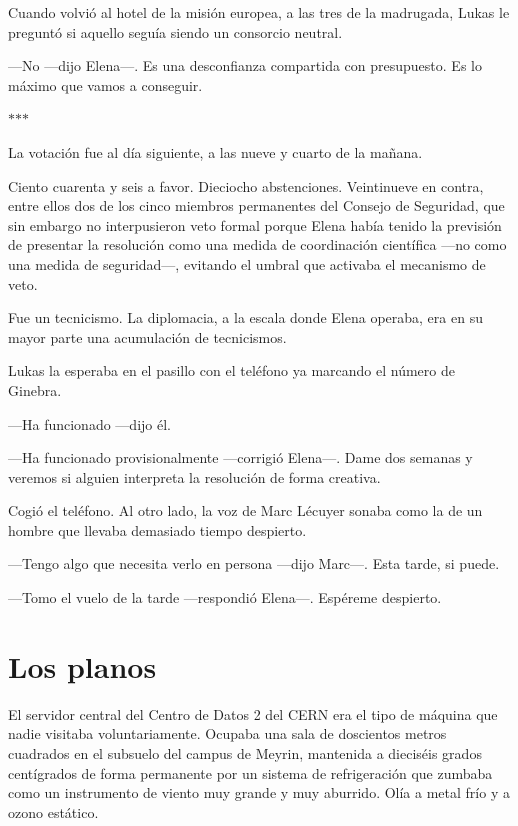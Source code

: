 \documentclass[11pt,a5paper,twoside]{book}
\begin{document}
Cuando volvió al hotel de la misión europea, a las tres de la madrugada, Lukas le preguntó si aquello seguía siendo un consorcio neutral.

—No —dijo Elena—. Es una desconfianza compartida con presupuesto. Es lo máximo que vamos a conseguir.

\vspace{1.5em}
\begin{center}$\ast$\quad$\ast$\quad$\ast$\end{center}
\vspace{1.5em}

La votación fue al día siguiente, a las nueve y cuarto de la mañana.

Ciento cuarenta y seis a favor. Dieciocho abstenciones. Veintinueve en contra, entre ellos dos de los cinco miembros permanentes del Consejo de Seguridad, que sin embargo no interpusieron veto formal porque Elena había tenido la previsión de presentar la resolución como una medida de coordinación científica —no como una medida de seguridad—, evitando el umbral que activaba el mecanismo de veto.

Fue un tecnicismo. La diplomacia, a la escala donde Elena operaba, era en su mayor parte una acumulación de tecnicismos.

Lukas la esperaba en el pasillo con el teléfono ya marcando el número de Ginebra.

—Ha funcionado —dijo él.

—Ha funcionado provisionalmente —corrigió Elena—. Dame dos semanas y veremos si alguien interpreta la resolución de forma creativa.

Cogió el teléfono. Al otro lado, la voz de Marc Lécuyer sonaba como la de un hombre que llevaba demasiado tiempo despierto.

—Tengo algo que necesita verlo en persona —dijo Marc—. Esta tarde, si puede.

—Tomo el vuelo de la tarde —respondió Elena—. Espéreme despierto.

\chapter{Los planos}

El servidor central del Centro de Datos 2 del CERN era el tipo de máquina que nadie visitaba voluntariamente. Ocupaba una sala de doscientos metros cuadrados en el subsuelo del campus de Meyrin, mantenida a dieciséis grados centígrados de forma permanente por un sistema de refrigeración que zumbaba como un instrumento de viento muy grande y muy aburrido. Olía a metal frío y a ozono estático.
\end{document}
